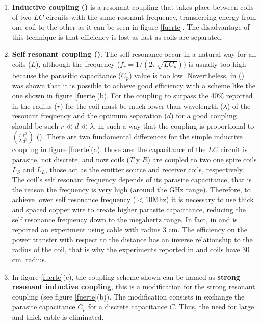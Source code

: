 \documentclass{intech}
\begin{document}
\begin{enumerate}
\item {\bf Inductive coupling (\cite{RES3})} is a resonant coupling that takes place between coils of two $LC$ circuits with the same resonant frequency, transferring energy from one coil to the other as it can be seen in figure \ref{fuerte}. The disadvantage of this technique is that efficiency is lost as fast as coils are separated.
\item {\bf Self resonant coupling (\cite{RES1})}. The self resonance occur in a natural way for all coils ($L$), although the frequency ($f_r=1/(2\pi \sqrt{L C_p})$) is usually too high because the parasitic capacitance ($C_p$) value is too low. Nevertheless, in (\cite{RES1}) was shown that it is possible to achieve good efficiency with a scheme like the one shown in figure \ref{fuerte}(b). For the coupling to surpass the 40\% reported in \cite{RES1} the radius  ($r$) for the coil must be much lower than wavelength ($\lambda$) of the resonant frequency and the optimum separation ($d$) for a good coupling should be such $r\ll d\ll \lambda$, in such a way that the coupling is proportional to $(\frac{r}{\lambda}\frac{r^3}{d^3})$
(\cite{meta}). There are two fundamental differences for the simple inductive coupling in figure \ref{fuerte}(a), those are: the capacitance of the $LC$ circuit is parasite, not discrete, and now coils ($T$ y $R$) are coupled to two one spire coils $L_S$ and $L_L$, those act as the emitter source and receiver coils, respectively. The coil's self resonant frequency depends of its parasite capacitance, that is the reason the frequency is very high (around the GHz range). Therefore, to achieve lower self resonance frequency ($<10$Mhz) it is necessary to use thick and spaced copper wire to create higher parasite capacitance, reducing the self resonance frequency down to the megahertz range. In fact, in \cite{RES1} and \cite{RES2} is reported an experiment using cable with radius 3 cm. The efficiency on the power transfer with respect to the distance has an inverse relationship to the radius of the coil, that is why the experiments reported in \cite{RES1} and \cite{RES2} coils have 30 cm. radius.
\item In figure \ref{fuerte}(c), the coupling scheme shown can be named as {\bf strong resonant inductive coupling}, this is a modification for the strong resonant coupling (see figure \ref{fuerte}(b)). The modification consists in exchange the parasite capacitance $C_p$ for a discrete capacitance $C$. Thus, the need for large and thick cable is eliminated.
\end{enumerate}
\end{document}
